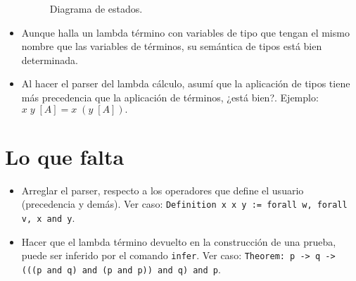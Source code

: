 \documentclass[a4paper,11pt]{article}
\begin{document}
\begin{itemize}
\begin{figure}
\begin{tikzpicture}[node distance=2cm]
  \end{tikzpicture}
  \caption{Diagrama de estados.} \label{Estados}
  \end{figure}
  
  \item Aunque halla un lambda término con variables de tipo que tengan el mismo nombre que las variables de términos, su semántica de tipos está
  bien determinada.
  
  \item Al hacer el parser del lambda cálculo, asumí que la aplicación de tipos tiene más precedencia que la aplicación de términos, ¿está bien?.
  Ejemplo: $x \; y \; [A] = x \; (y \; [A]).$

\end{itemize}

\section{Lo que falta}
\begin{itemize}
  \item Arreglar el parser, respecto a los operadores que define el usuario (precedencia y demás).
  Ver caso: \texttt{Definition x x y := forall w, forall v, x and y}.
  \item Hacer que el lambda término devuelto en la construcción de una prueba, puede ser inferido por el comando \texttt{infer}.
  Ver caso: \texttt{Theorem: p -> q -> (((p and q) and (p and p)) and q) and p}.
\end{itemize}
\end{document}
